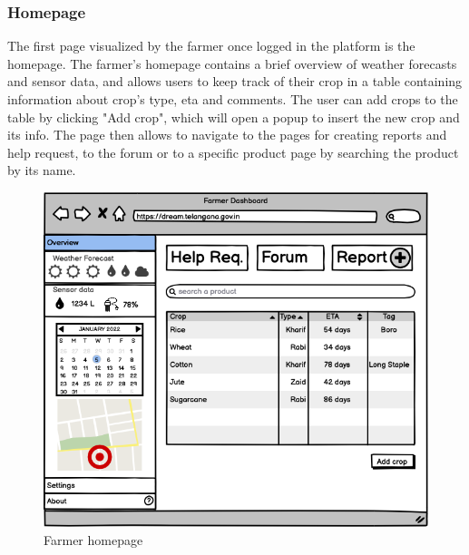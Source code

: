 \documentclass[10pt]{article} %
\begin{document}
\subsubsection{Homepage}
The first page visualized by the farmer once logged in the platform is the homepage. The farmer's homepage contains a brief overview of weather forecasts
and sensor data, and allows users to keep track of their crop in a table containing information about crop's type, eta and comments. The user can add crops 
to the table by clicking "Add crop", which will open a popup to insert the new crop and its info. The page then allows to navigate to the pages for creating reports
and help request, to the forum or to a specific product page by searching the product by its name.\\
\begin{figure}[h!]
    \centering
    \includegraphics[scale=0.54]{images/uimockups/f_homepage.png}
    \caption{Farmer homepage}
    \label{fig:ui_f_homepage}
\end{figure}
\newpage
\end{document}
